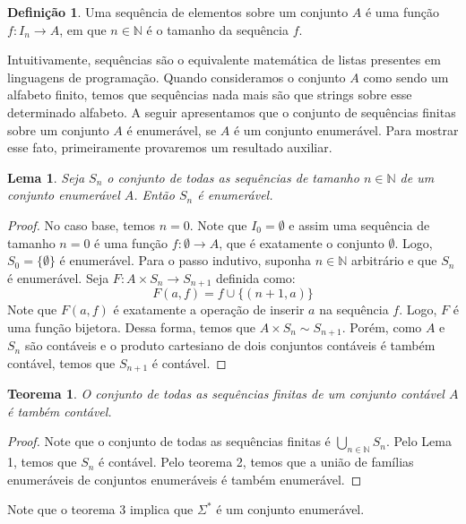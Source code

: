 \documentclass[a4paper]{article}
\newtheorem{Lemma}{Lema}
\newtheorem{Theorem}{Teorema}
\theoremstyle{definition}
\newtheorem{Definition}{Definição}
\begin{document}
  \begin{Definition}
    Uma sequência de elementos sobre um conjunto $A$ é uma função $f : I_n\to
    A$, em que $n \in \mathbb{N}$ é o tamanho da sequência $f$.
  \end{Definition}

  Intuitivamente, sequências são o equivalente matemática de listas presentes em
  linguagens de programação. Quando consideramos o conjunto $A$ como sendo um
  alfabeto finito, temos que sequências nada mais são que strings sobre esse
  determinado alfabeto. A seguir apresentamos que o conjunto de sequências
  finitas sobre um conjunto $A$ é enumerável, se $A$ é um conjunto enumerável.
  Para mostrar esse fato, primeiramente provaremos um resultado auxiliar.

  \begin{Lemma}
    Seja $S_n$ o conjunto de todas as sequências de tamanho $n\in\mathbb{N}$ de
    um conjunto enumerável $A$. Então $S_n$ é enumerável.
  \end{Lemma}
  \begin{proof}
    No caso base, temos $n = 0$. Note que $I_0 = \emptyset$ e assim uma
    sequência de tamanho $n = 0$ é uma função $f : \emptyset \to A$, que
    é exatamente o conjunto $\emptyset$. Logo, $S_0 = \{\emptyset\}$ é
    enumerável. Para o passo indutivo, suponha $n\in\mathbb{N}$ arbitrário e que
    $S_n$ é enumerável. Seja $F : A \times S_n \to S_{n + 1}$ definida como:
    \[
      F(a,f) = f \cup \{(n+1,a)\}
    \]
    Note que $F(a,f)$ é exatamente a operação de inserir $a$ na sequência $f$.
    Logo, $F$ é uma função bijetora. Dessa forma, temos que $A \times S_n \sim
    S_{n + 1}$. Porém, como $A$ e $S_n$ são contáveis e o produto cartesiano de
    dois conjuntos contáveis é também contável, temos que $S_{n + 1}$ é contável.
  \end{proof}

  \begin{Theorem}
    O conjunto de todas as sequências finitas de um conjunto contável $A$ é
    também contável.
  \end{Theorem}
  \begin{proof}
    Note que o conjunto de todas as sequências finitas é
    $\bigcup_{n\in\mathbb{N}}S_n$. Pelo Lema 1, temos que $S_n$ é contável. Pelo
    teorema 2, temos que a união de famílias enumeráveis de conjuntos
    enumeráveis é também enumerável.
  \end{proof}

  Note que o teorema 3 implica que $\Sigma^*$ é um conjunto enumerável.
\end{document}
